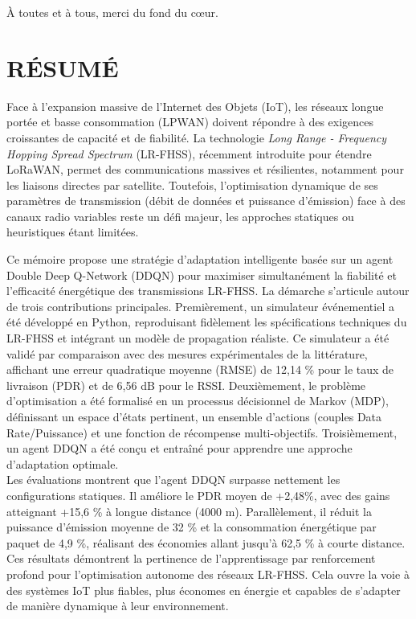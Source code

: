 \documentclass[a4paper,12pt]{report}
\begin{document}
	À toutes et à tous, merci du fond du cœur.
	
	\newpage
	\section*{\centering RÉSUMÉ}
	
	Face à l'expansion massive de l'Internet des Objets (IoT), les réseaux longue portée et basse consommation (LPWAN) doivent répondre à des exigences croissantes de capacité et de fiabilité. La technologie \textit{Long Range - Frequency Hopping Spread Spectrum} (LR-FHSS), récemment introduite pour étendre LoRaWAN, permet des communications massives et résilientes, notamment pour les liaisons directes par satellite. Toutefois, l'optimisation dynamique de ses paramètres de transmission (débit de données et puissance d'émission) face à des canaux radio variables reste un défi majeur, les approches statiques ou heuristiques étant limitées.
	
	Ce mémoire propose une stratégie d'adaptation intelligente basée sur un agent Double Deep Q-Network (DDQN) pour maximiser simultanément la fiabilité et l'efficacité énergétique des transmissions LR-FHSS. La démarche s'articule autour de trois contributions principales. Premièrement, un simulateur événementiel a été développé en Python, reproduisant fidèlement les spécifications techniques du LR-FHSS  et intégrant un modèle de propagation réaliste. Ce simulateur a été validé par comparaison avec des mesures expérimentales de la littérature, affichant une erreur quadratique moyenne (RMSE) de 12,14 \% pour le taux de livraison (PDR) et de 6,56 dB pour le RSSI. Deuxièmement, le problème d'optimisation a été formalisé en un processus décisionnel de Markov (MDP), définissant un espace d'états pertinent, un ensemble d'actions (couples Data Rate/Puissance) et une fonction de récompense multi-objectifs. Troisièmement, un agent DDQN a été conçu et entraîné pour apprendre une approche d'adaptation optimale.\\
	
	Les évaluations montrent que l'agent DDQN surpasse nettement les configurations statiques. Il améliore le PDR moyen de +2,48\%, avec des gains atteignant +15,6 \% à longue distance (4000 m). Parallèlement, il réduit la puissance d'émission moyenne de 32 \% et la consommation énergétique par paquet de 4,9 \%, réalisant des économies allant jusqu'à 62,5 \% à courte distance. Ces résultats démontrent la pertinence de l'apprentissage par renforcement profond pour l'optimisation autonome des réseaux LR-FHSS. Cela ouvre la voie à des systèmes IoT plus fiables, plus économes en énergie et capables de s'adapter de manière dynamique à leur environnement.
	
\end{document}
